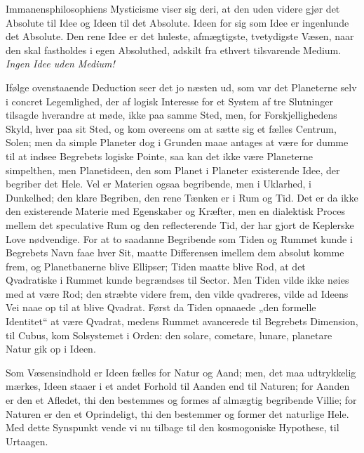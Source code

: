 \documentclass[12pt,a4paper]{book}
\begin{document}
Immanensphilosophiens Mysticisme viser sig deri, at den uden videre gjør det
Absolute til Idee og Ideen til det Absolute. Ideen for sig som Idee er
ingenlunde det Absolute. Den rene Idee er det huleste, afmægtigste,
tvetydigste Væsen, naar den skal fastholdes i egen Absoluthed, adskilt fra
ethvert tilsvarende Medium. \emph{Ingen Idee uden Medium!}

Ifølge ovenstaaende Deduction seer det jo næsten ud, som var det Planeterne
selv i concret Legemlighed, der af logisk Interesse for et System af tre
Slutninger tilsagde hverandre at møde, ikke paa samme Sted, men, for
Forskjellighedens Skyld, hver paa sit Sted, og kom overeens om at sætte sig et
fælles Centrum, Solen; men da simple Planeter dog i Grunden maae antages at
være for dumme til at indsee Begrebets logiske Pointe, saa kan det ikke være
Planeterne simpelthen, men Planetideen, den som Planet i Planeter existerende
Idee, der begriber det Hele. Vel er Materien ogsaa begribende, men i Uklarhed,
i Dunkelhed; den klare Begriben, den rene Tænken er i Rum og Tid. Det er da
ikke den existerende Materie med Egenskaber og Kræfter, men en dialektisk
Proces mellem det speculative Rum og den reflecterende Tid, der har gjort de
Keplerske Love nødvendige. For at to saadanne Begribende som Tiden og Rummet
kunde i Begrebets Navn faae hver Sit, maatte Differensen imellem dem absolut
komme frem, og Planetbanerne blive Ellipser; Tiden maatte blive Rod, at det
Qvadratiske i Rummet kunde begrændses til Sector. Men Tiden vilde ikke nøies
med at være Rod; den stræbte videre frem, den vilde qvadreres, vilde ad Ideens
Vei naae op til at blive Qvadrat. Først da Tiden opnaaede „den formelle
Identitet“ at være Qvadrat, medens Rummet avancerede til Begrebets Dimension,
til Cubus, kom Solsystemet i Orden: den solare, cometare, lunare, planetare
Natur gik op i Ideen.

Som Væsensindhold er Ideen fælles for Natur og Aand; men, det maa udtrykkelig
mærkes, Ideen staaer i et andet Forhold til Aanden end til Naturen; for Aanden
er den et Afledet, thi den bestemmes og formes af almægtig begribende Villie;
for Naturen er den et Oprindeligt, thi den bestemmer og former det naturlige
Hele. Med dette Synspunkt vende vi nu tilbage til den kosmogoniske Hypothese,
til Urtaagen.
\end{document}

